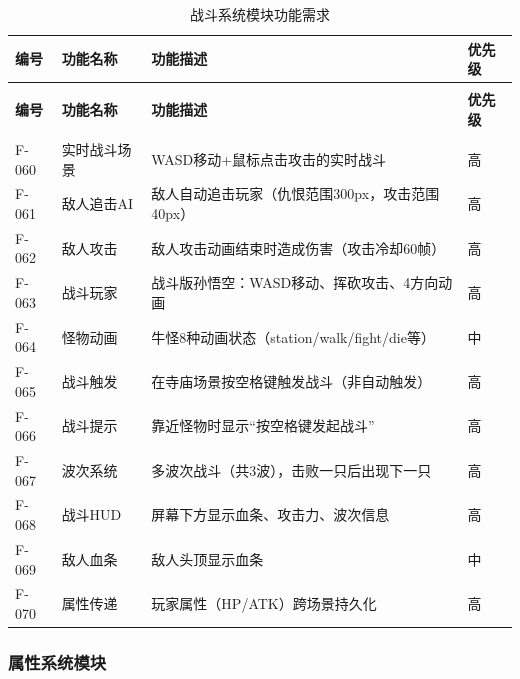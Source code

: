 \documentclass[12pt,a4paper]{article}
\begin{document}
\begin{longtable}{>{\centering\arraybackslash}m{1.5cm}>{\centering\arraybackslash}m{2.5cm}>{\centering\arraybackslash}m{6cm}>{\centering\arraybackslash}m{1.5cm}}
\caption{战斗系统模块功能需求} \label{tab:f_battle} \\
\toprule
\textbf{编号} & \textbf{功能名称} & \textbf{功能描述} & \textbf{优先级} \\
\midrule
\endfirsthead

\toprule
\multicolumn{4}{l}{续表} \\
\textbf{编号} & \textbf{功能名称} & \textbf{功能描述} & \textbf{优先级} \\
\midrule
\endhead

\midrule
\multicolumn{4}{r}{续下页} \\
\endfoot

\bottomrule
\endlastfoot

F-060 & 实时战斗场景 & WASD移动+鼠标点击攻击的实时战斗 & 高 \\
F-061 & 敌人追击AI & 敌人自动追击玩家（仇恨范围300px，攻击范围40px） & 高 \\
F-062 & 敌人攻击 & 敌人攻击动画结束时造成伤害（攻击冷却60帧） & 高 \\
F-063 & 战斗玩家 & 战斗版孙悟空：WASD移动、挥砍攻击、4方向动画 & 高 \\
F-064 & 怪物动画 & 牛怪8种动画状态（station/walk/fight/die等） & 中 \\
F-065 & 战斗触发 & 在寺庙场景按空格键触发战斗（非自动触发） & 高 \\
F-066 & 战斗提示 & 靠近怪物时显示“按空格键发起战斗” & 高 \\
F-067 & 波次系统 & 多波次战斗（共3波），击败一只后出现下一只 & 高 \\
F-068 & 战斗HUD & 屏幕下方显示血条、攻击力、波次信息 & 高 \\
F-069 & 敌人血条 & 敌人头顶显示血条 & 中 \\
F-070 & 属性传递 & 玩家属性（HP/ATK）跨场景持久化 & 高 \\
\end{longtable}

\subsubsection{属性系统模块}
\end{document}
